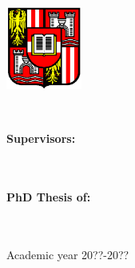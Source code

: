 





\begin{titlepage}
\begin{center}
\large



\myUni \\
\myFaculty \\
\myDepartment \\
\bigskip 
\bigskip
\bigskip
\includegraphics[width=2.5cm]{JkuLogo}

\bigskip
\bigskip
\bigskip
\bigskip
\bigskip

{\Huge\myTitle \\
}
\end{center}

\bigskip
\bigskip
\bigskip
\bigskip
\bigskip
\bigskip
\bigskip
\bigskip
   
\begin{flushleft}
{\normalsize
					\textbf{Supervisors:}\\
					\myProf \\
					\myOtherProf \\
					
					}
					
\end{flushleft}

\bigskip
\bigskip
\bigskip
\begin{flushright}
\textbf{PhD Thesis of:} \\
		\myName \\
		\myMatricola \\
\end{flushright}

\bigskip
\bigskip
\bigskip
\bigskip
\bigskip
\bigskip
\bigskip
\bigskip
\bigskip
\bigskip
\bigskip
\bigskip
\bigskip

\begin{center}
{\normalsize
					Academic year 20??-20??
					}
\end{center}
\end{titlepage}






